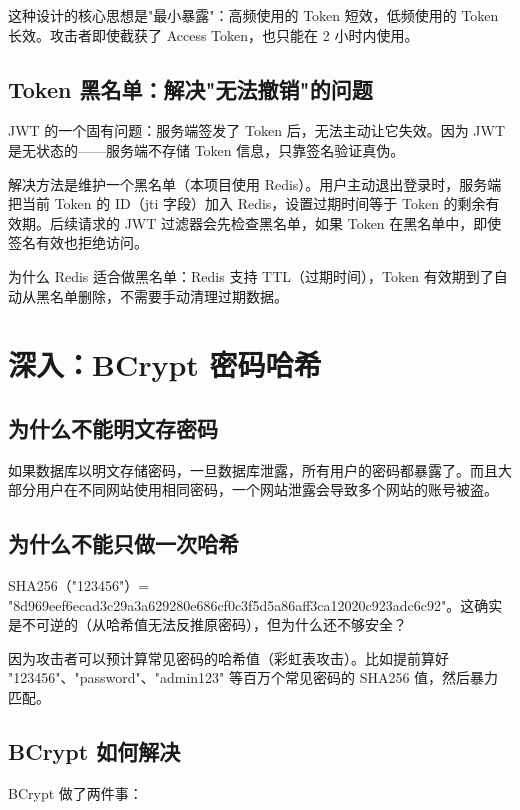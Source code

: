 \documentclass[12pt,a4paper]{ctexart}
\begin{document}
这种设计的核心思想是"最小暴露"：高频使用的 Token 短效，低频使用的 Token 长效。攻击者即使截获了 Access Token，也只能在 2 小时内使用。

\subsection{Token 黑名单：解决"无法撤销"的问题}

JWT 的一个固有问题：服务端签发了 Token 后，无法主动让它失效。因为 JWT 是无状态的——服务端不存储 Token 信息，只靠签名验证真伪。

解决方法是维护一个黑名单（本项目使用 Redis）。用户主动退出登录时，服务端把当前 Token 的 ID（jti 字段）加入 Redis，设置过期时间等于 Token 的剩余有效期。后续请求的 JWT 过滤器会先检查黑名单，如果 Token 在黑名单中，即使签名有效也拒绝访问。

为什么 Redis 适合做黑名单：Redis 支持 TTL（过期时间），Token 有效期到了自动从黑名单删除，不需要手动清理过期数据。

\section{深入：BCrypt 密码哈希}

\subsection{为什么不能明文存密码}

如果数据库以明文存储密码，一旦数据库泄露，所有用户的密码都暴露了。而且大部分用户在不同网站使用相同密码，一个网站泄露会导致多个网站的账号被盗。

\subsection{为什么不能只做一次哈希}

SHA256（"123456"）= "8d969eef6ecad3c29a3a629280e686cf0c3f5d5a86aff3ca12020c923adc6c92"。这确实是不可逆的（从哈希值无法反推原密码），但为什么还不够安全？

因为攻击者可以预计算常见密码的哈希值（彩虹表攻击）。比如提前算好 "123456"、"password"、"admin123" 等百万个常见密码的 SHA256 值，然后暴力匹配。

\subsection{BCrypt 如何解决}

BCrypt 做了两件事：
\end{document}
